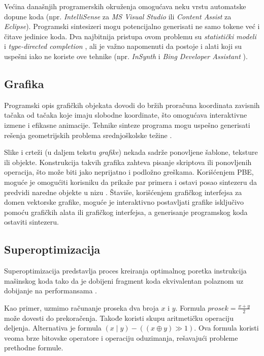 Većina današnjih programerskih okruženja omogućava neku vrstu a\-u\-to\-ma\-tske dopune koda (npr. \emph{IntelliSense} za \emph{MS Visual Studio} ili \emph{Content Assist} za \emph{Eclipse}). Programski sintesizeri mogu potencijalno generisati ne samo tokene već i čitave jedinice koda. Dva najbitnija pristupa ovom problemu su \emph{statistički modeli} \cite{CCWSLM} i \emph{type-directed completion} \cite{TDCOPE}, ali je važno napomenuti da postoje i alati koji su uspešni iako ne koriste ove tehnike (npr. \emph{InSynth} \cite{IS} i \emph{Bing Developer Assistant} \cite{BDA}).


\subsection{Grafika}
\label{subsec:Grafika}

Programski opis grafičkih objekata dovodi do bržih proračuna koordinata zavisnih tačaka od tačaka koje imaju slobodne koordinate, što omogućava interaktivne izmene i efikasne animacije. Tehnike sinteze programa mogu uspešno generisati rešenja geometrijskih problema sre\-dnjo\-ško\-lske težine \cite{SynthesizingGeometryConstructions}.

Slike i crteži (u daljem tekstu \emph{grafike}) nekada sadrže ponovljene šablone, teksture ili objekte. Konstrukcija takvih grafika zahteva pisanje skriptova ili ponovljenih operacija, što može biti jako neprijatno i podložno greškama. Korišćenjem PBE, moguće je omogućiti korisniku da prikaže par primera i ostavi posao sintezeru da predvidi naredne objekte u nizu \cite{Backpropagation}. Štaviše, korišćenjem grafičkog interfejsa za domen vektorske grafike, moguće je interaktivno postavljati grafike isključivo pomoću grafičkih alata ili grafičkog interfejsa, a generisanje programskog koda ostaviti sintezeru.


\subsection{Superoptimizacija}
\label{subsec:Superoptimizacija}

Superoptimizacija predstavlja proces kreiranja optimalnog poretka instrukcija mašinskog koda tako da je dobijeni fragment koda ekvivalentan polaznom uz dobijanje na performansama \cite{Superoptimizer}.

Kao primer, uzmimo računanje proseka dva broja $x$ i $y$. Formula $\mathit{prosek}=\frac{x+y}{2}$ može dovesti do prekoračenja. Takođe koristi skupu aritmetičku operaciju deljenja. Alternativa je formula $(x \mid y)-((x \oplus y) \gg 1)$. Ova formula koristi veoma brze bitovske operatore i operaciju oduzimanja, rešavajući probleme prethodne formule.

